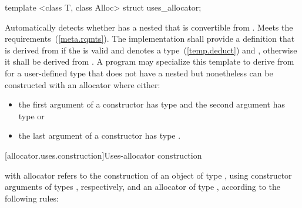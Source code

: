 %
\begin{itemdecl}
template <class T, class Alloc> struct uses_allocator;
\end{itemdecl}

\begin{itemdescr}
\pnum
\remarks Automatically detects whether  has a nested  that
is convertible from . Meets the 
requirements~(\ref{meta.rqmts}). The implementation shall provide a definition that is
derived from  if the  
is valid and denotes a type~(\ref{temp.deduct}) and
, otherwise it shall be
derived from . A program may specialize this template to derive from
 for a user-defined type  that does not have a nested
 but nonetheless can be constructed with an allocator where
either:

\begin{itemize}
\item the first argument of a constructor has type  and the
second argument has type  or

\item the last argument of a constructor has type .
\end{itemize}
\end{itemdescr}

[allocator.uses.construction]{Uses-allocator construction}

\pnum
{} with allocator  refers to the
construction of an object  of type , using constructor arguments
 of types , respectively, and an allocator
 of type , according to the following rules:

